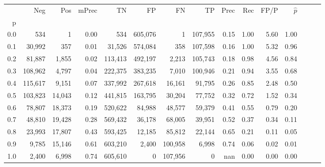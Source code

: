 \begin{tabular}{rrrrrrrrrrrrrrr}
\toprule
{} &      Neg &     Pos & mPrec &       TN &       FP &       FN &       TP &  Prec &   Rec &  FP/P & $\hat{p}$ \\
p   &          &         &       &          &          &          &          &       &       &       &           \\
\midrule
0.0 &      534 &       1 &  0.00 &      534 &  605,076 &        1 &  107,955 &  0.15 &  1.00 &  5.60 &      1.00 \\
0.1 &   30,992 &     357 &  0.01 &   31,526 &  574,084 &      358 &  107,598 &  0.16 &  1.00 &  5.32 &      0.96 \\
0.2 &   81,887 &   1,855 &  0.02 &  113,413 &  492,197 &    2,213 &  105,743 &  0.18 &  0.98 &  4.56 &      0.84 \\
0.3 &  108,962 &   4,797 &  0.04 &  222,375 &  383,235 &    7,010 &  100,946 &  0.21 &  0.94 &  3.55 &      0.68 \\
0.4 &  115,617 &   9,151 &  0.07 &  337,992 &  267,618 &   16,161 &   91,795 &  0.26 &  0.85 &  2.48 &      0.50 \\
0.5 &  103,823 &  14,043 &  0.12 &  441,815 &  163,795 &   30,204 &   77,752 &  0.32 &  0.72 &  1.52 &      0.34 \\
0.6 &   78,807 &  18,373 &  0.19 &  520,622 &   84,988 &   48,577 &   59,379 &  0.41 &  0.55 &  0.79 &      0.20 \\
0.7 &   48,810 &  19,428 &  0.28 &  569,432 &   36,178 &   68,005 &   39,951 &  0.52 &  0.37 &  0.34 &      0.11 \\
0.8 &   23,993 &  17,807 &  0.43 &  593,425 &   12,185 &   85,812 &   22,144 &  0.65 &  0.21 &  0.11 &      0.05 \\
0.9 &    9,785 &  15,146 &  0.61 &  603,210 &    2,400 &  100,958 &    6,998 &  0.74 &  0.06 &  0.02 &      0.01 \\
1.0 &    2,400 &   6,998 &  0.74 &  605,610 &        0 &  107,956 &        0 &   nan &  0.00 &  0.00 &      0.00 \\
\bottomrule
\end{tabular}
